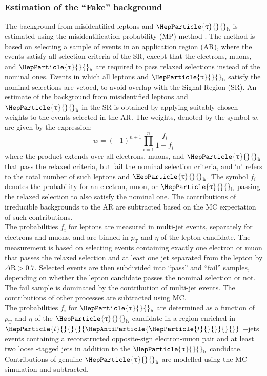 \documentclass[12pt, a4paper]{article}
\newcommand{\pt}{\ensuremath{p_{\mathrm{T}}}\xspace}
\newcommand{\DR}{\Delta\text{R}}
\DeclareRobustCommand{\PQb}{{\HepParticle{b}{}{}}\xspace} %
\DeclareRobustCommand{\PQt}{\HepParticle{t}{}{}} %
\DeclareRobustCommand{\PAQt}{{\HepAntiParticle{\PQt}{}{}}\xspace} %
\DeclareRobustCommand{\PGt}{{\HepParticle{\uptau}{}{}}\xspace} %
\newcommand{\ttbar}{\PQt{}\PAQt} %
\newcommand{\tauh}{\ensuremath{\PGt_\mathrm{h}}\xspace}
\begin{document}
\subsubsection{Estimation of the “Fake” background}\label{fake_bkg}
The background from misidentified leptons and $\tauh$ is estimated using the misidentification
probability (MP) method \cite{CMS:2018fdh}. The method is based on selecting a sample of events in an application region (AR), where the events satisfy all selection criteria of the SR, except that the electrons, muons, and $\tauh$ are required to pass relaxed selections instead of the nominal ones.
Events in which all leptons and $\tauh$ satisfy the nominal selections are vetoed, to avoid overlap with the Signal Region (SR). An estimate of the background from misidentified leptons and $\tauh$ in the SR is obtained by applying suitably chosen weights to the events selected in the AR. The weights, denoted by the symbol $w$, are given by the expression:
\begin{equation}
	w = (-1)^{n+1}\prod_{i=1}^{n}\frac{f_{i}}{1-f_{i}}
\end{equation}
where the product extends over all electrons, muons, and $\tauh$ that pass the relaxed criteria, but fail the nominal selection criteria, and `n' refers to the total number of such leptons and $\tauh$. The symbol $f_{i}$ denotes the probability for an electron, muon, or $\tauh$ passing the relaxed selection to also satisfy the nominal one. The contributions of irreducible backgrounds to the AR are subtracted based on the MC expectation of such contributions.\\
The probabilities $f_{i}$ for leptons are measured in multi-jet events, separately for electrons and muons, and are binned in $\pt$ and $\eta$ of the lepton candidate. The measurement is based on
selecting events containing exactly one electron or muon that passes the relaxed selection and
at least one jet separated from the lepton by $\DR > 0.7$. Selected events are then subdivided into “pass” and “fail” samples, depending on whether the lepton candidate passes the nominal selection or not. The fail sample is dominated by the contribution of multi-jet events. The
contributions of other processes are subtracted using MC.\\
The probabilities $f_{i}$ for $\tauh$ are determined as a function of $\pt$ and $\eta$ of the $\tauh$ candidate in a region enriched in $\ttbar$ +jets events containing a reconstructed opposite-sign electron-muon pair and at least two loose \PQb-tagged jets in addition to the $\tauh$ candidate. Contributions of genuine $\tauh$ are modelled using the MC simulation and subtracted.
\end{document}
